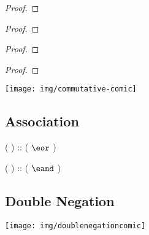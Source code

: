 \begin{multicols}{2}

\begin{proof}
\end{proof}

\begin{proof}
\end{proof}

\end{multicols}

\begin{multicols}{2}

\begin{proof}
\end{proof}

\begin{proof}
\end{proof}

\end{multicols}

\begin{center}
\texttt{[image: img/commutative-comic]}
\end{center}

\subsection{Association}

\begin{multicols}{2}

 \eor ( \eor {}) :: ( $\eor$ ) \eor {}

 \eand ( \eand {}) :: ( $\eand$ ) \eand {}

\end{multicols}

\subsection{Double Negation}

\begin{center}
\texttt{[image: img/doublenegationcomic]}
\end{center}

